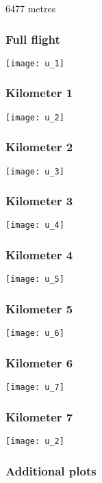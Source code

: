 \documentclass[]{article}
\begin{document}
6477 metres

\subsubsection{Full flight}\label{full-flight-20}

\texttt{[image: u\_1]}

\subsubsection{Kilometer 1}\label{kilometer-1-20}

\texttt{[image: u\_2]}

\subsubsection{Kilometer 2}\label{kilometer-2-20}

\texttt{[image: u\_3]}

\subsubsection{Kilometer 3}\label{kilometer-3-20}

\texttt{[image: u\_4]}

\subsubsection{Kilometer 4}\label{kilometer-4-19}

\texttt{[image: u\_5]}

\subsubsection{Kilometer 5}\label{kilometer-5-17}

\texttt{[image: u\_6]}

\subsubsection{Kilometer 6}\label{kilometer-6-13}

\texttt{[image: u\_7]}

\subsubsection{Kilometer 7}\label{kilometer-7-9}

\texttt{[image: u\_2]}

\subsubsection{Additional plots}\label{additional-plots-20}
\end{document}
